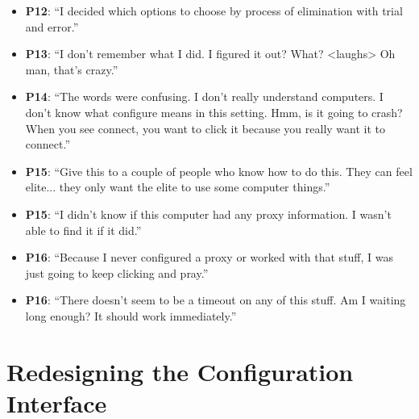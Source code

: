 \documentclass{template}
\begin{document}
\begin{itemize}
\item{{\bfseries P12}: ``I decided which options to choose by process of elimination with trial and error.'' }
\item{{\bfseries P13}: ``I don't remember what I did. I figured it out? What? <laughs> Oh man, that's crazy.''}
\item{{\bfseries P14}: ``The words were confusing. I don't really understand computers. I don't know what configure means in this setting. Hmm, is it going to crash? When you see connect, you want to click it because you really want it to connect.''}
\item{{\bfseries P15}: ``Give this to a couple of people who know how to do this. They can feel elite... they only want the elite to use some computer things.''}
\item{{\bfseries P15}: ``I didn't know if this computer had any proxy information. I wasn't able to find it if it did.''}
\item{{\bfseries P16}: ``Because I never configured a proxy or worked with that stuff, I was just going to keep clicking and pray.''}
\item{{\bfseries P16}: ``There doesn't seem to be a timeout on any of this stuff. Am I waiting long enough? It should work immediately.''}
\end{itemize} 


\section{Redesigning the Configuration Interface}
\end{document}
